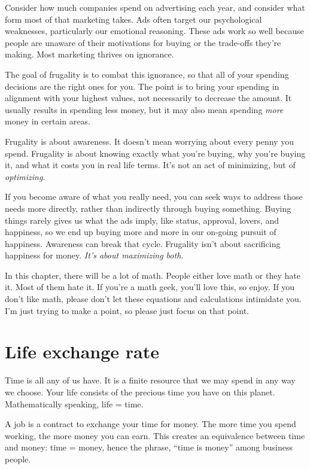 Consider how much companies spend on advertising each year, and consider what form most of that marketing takes. Ads often target our psychological weaknesses, particularly our emotional reasoning. These ads work so well because people are unaware of their motivations for buying or the trade-offs they're making. Most marketing thrives on ignorance.

The goal of frugality is to combat this ignorance, so that all of your spending decisions are the right ones for you. The point is to bring your spending in alignment with your highest values, not necessarily to decrease the amount. It usually results in spending less money, but it may also mean spending \emph{more} money in certain areas.

Frugality is about awareness. It doesn't mean worrying about every penny you spend. Frugality is about knowing exactly what you're buying, why you're buying it, and what it costs you in real life terms. It's not an act of minimizing, but of \emph{optimizing.}

If you become aware of what you really need, you can seek ways to address those needs more directly, rather than indirectly through buying something. Buying things rarely gives us what the ads imply, like status, approval, lovers, and happiness, so we end up buying more and more in our on-going pursuit of happiness. Awareness can break that cycle. Frugality isn't about sacrificing happiness for money. \emph{It's about maximizing both.}

In this chapter, there will be a lot of math. People either love math or they hate it. Most of them hate it. If you're a math geek, you'll love this, so enjoy. If you don't like math, please don't let these equations and calculations intimidate you. I'm just trying to make a point, so please just focus on that point.

\section{Life exchange rate}
Time is all any of us have. It is a finite resource that we may spend in any way we choose. Your life consists of the precious time you have on this planet. Mathematically speaking, life = time.

A job is a contract to exchange your time for money. The more time you spend working, the more money you can earn. This creates an equivalence between time and money: time = money, hence the phrase, ``time is money'' among business people.

